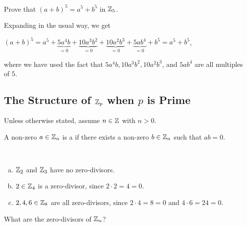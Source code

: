 \documentclass[11pt,fleqn,dvipsnames,usenames]{article}
\newcommand{\p}{\noindent}
\begin{document}
%
\begin{example}
Prove that $(a+b)^{5} = a^{5} + b^{5}$ in $\mathbb{Z}_5$.
\end{example}
\begin{solution}
Expanding in the usual way, we get
\begin{center}
$(a + b)^5 = a^{5} + \underbrace{5a^4b}_{=0} + \underbrace{10a^3b^2}_{=0} + \underbrace{10a^2b^3}_{=0} + \underbrace{5ab^4}_{=0} + b^5 = a^5 + b^5$,
\end{center}
where we have used the fact that $5a^4b, 10a^3b^2, 10a^2b^3$, and $5ab^4$ are all multiples of $5$.
\end{solution}
%

\subsection{The Structure of $\mathbb{Z}_p$ when $p$ is Prime}
\p Unless otherwise stated, assume $n\in\mathbb{Z}$ with $n > 0$.  
\begin{definition}
A non-zero $a\in\mathbb{Z}_{n}$ is a  if there exists a non-zero $b\in\mathbb{Z}_{n}$ such that $ab = 0$.
\end{definition}
%
\begin{examples}~
\begin{enumerate}[(a)]
\item $\mathbb{Z}_2$ and $\mathbb{Z}_3$ have no zero-divisors.
\item $2\in\mathbb{Z}_4$ is a zero-divisor, since $2\cdot 2 = 4 = 0$.
\item $2,4,6\in\mathbb{Z}_8$ are all zero-divisors, since $2\cdot 4 = 8 = 0$ and $4\cdot 6 = 24 = 0$.
\end{enumerate}
\end{examples}
\vsp

\question What are the zero-divisors of $\mathbb{Z}_{n}$?
\vsp
\end{document}
